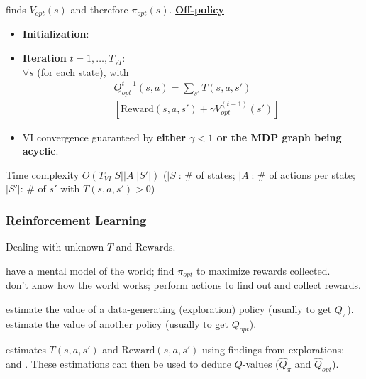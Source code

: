  finds $V_{opt}(s)$ and therefore $\pi_{opt}(s)$. \textbf{\underline{Off-policy}}
\begin{itemize}
    \item \textbf{Initialization}: 
    \item \textbf{Iteration} $t = 1,\dots,T_{VI}$:\\
        $\forall s$ (for each state), 
        with \begin{displaymath}
            \boxed{
                \begin{aligned}
                    &Q_{opt}^{t-1}(s,a) = \sum_{s'}T(s,a,s')\\
                    &\left[\text{Reward}(s,a,s') + \gamma V_{opt}^{(t-1)}(s')\right]
                \end{aligned}
            }
        \end{displaymath}
    \item VI convergence guaranteed by
        \textbf{either $\gamma < 1$ or the MDP graph being acyclic}.
\end{itemize}
Time complexity $O(T_{VI}|S||A||S'|)$ ($|S|$: \# of states; $|A|$: \# of
actions per state; $|S'|$: \# of $s'$ with $T(s,a,s') > 0$)

\subsubsection{Reinforcement Learning}

Dealing with unknown $T$ and $\text{Rewards}$.

 have a mental model of the world; find
$\pi_{opt}$ to maximize rewards collected.\\
 don't know how the world works;
perform actions to find out and collect rewards.

 estimate the value of a data-generating (exploration)
policy (usually to get $Q_{\pi}$).\\
 estimate the value of another policy (usually to get
$Q_{opt}$).

 estimates $T(s,a,s')$ and
$\text{Reward}(s,a,s')$ using findings from explorations:
and .
These estimations can then be used to deduce $Q$-values ($\hat{Q}_\pi$ and $\hat{Q}_{opt}$).

